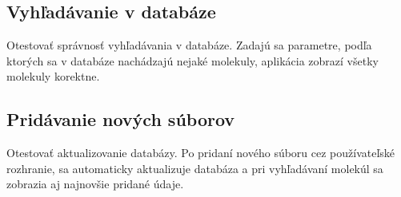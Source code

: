 \documentclass[12pt,a4paper, draft]{article}
\begin{document}
\subsection*{Vyhľadávanie v databáze}
Otestovať správnosť vyhľadávania v databáze. Zadajú sa parametre, podľa ktorých sa v databáze nachádzajú nejaké molekuly, aplikácia zobrazí všetky molekuly korektne.

\subsection*{Pridávanie nových súborov}
Otestovať aktualizovanie databázy. Po pridaní nového súboru cez používateľské rozhranie, sa automaticky aktualizuje databáza a pri vyhľadávaní molekúl sa zobrazia aj najnovšie pridané údaje.
\end{document}
